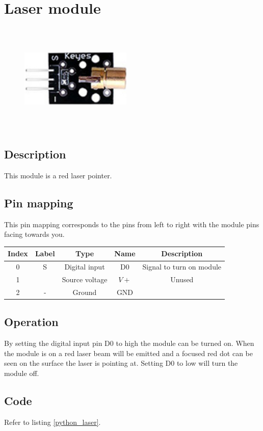 \section{Laser module}
\begin{figure}[H]
    \centering
    \includegraphics[angle=0, keepaspectratio=true, scale=1, width=200px, height=200px]{images/laser.jpg}
\end{figure}
\subsection*{Description}
This module is a red laser pointer.%
\subsection*{Pin mapping}
This pin mapping corresponds to the pins from left to right with the module pins facing towards you.
\begin{table}[H]
    \centering
    \begin{tabular}{|c|c|c|c|c|}
    \hline
    Index &Label &Type &Name &Description\\ \hline
    0 &S &Digital input &D0 &Signal to turn on module\\ \hline
    1 & &Source voltage &$V+$ &Unused\\ \hline
    2 &- &Ground &GND &\\ \hline
    \end{tabular}
\end{table}
\subsection*{Operation}
By setting the digital input pin D0 to high the module can be turned on. When the module is on a red laser beam will be emitted and a focused red dot can be seen on the surface the laser is pointing at. Setting D0 to low will turn the module off.
\subsection*{Code}
Refer to listing \ref{python_laser}.
%